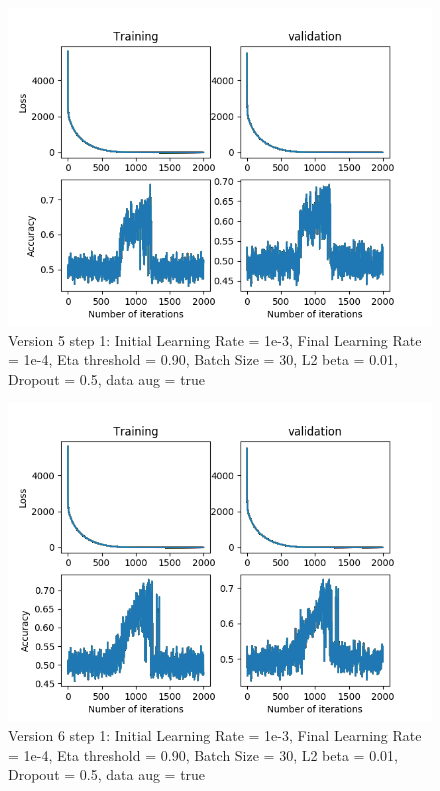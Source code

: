 \documentclass[12pt,reqno]{amsart}
\numberwithin{equation}{section}
\begin{document}
\begin{enumerate}
\begin{figure}[H]
\centering
\includegraphics[scale=0.6]{data_liquid140_version5_step1}
\caption{Version 5 step 1: Initial Learning Rate = 1e-3, Final Learning Rate = 1e-4, Eta threshold = 0.90, Batch Size = 30, L2 beta = 0.01, Dropout = 0.5, data aug = true}
\end{figure}

\begin{figure}[H]
\centering
\includegraphics[scale=0.6]{data_liquid140_version6_step1}
\caption{Version 6 step 1: Initial Learning Rate = 1e-3, Final Learning Rate = 1e-4, Eta threshold = 0.90, Batch Size = 30, L2 beta = 0.01, Dropout = 0.5, data aug = true}
\end{figure}


\end{enumerate}
\end{document}
